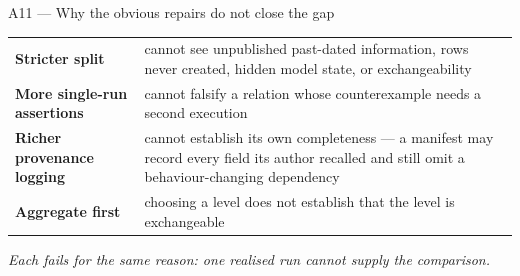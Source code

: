 \documentclass[aspectratio=169,11pt]{beamer}
\newcommand{\msg}[1]{%
  \vfill\vspace{0.2em}%
  \begin{center}\begin{minipage}{0.94\textwidth}\centering
  \small\itshape\color{black!70}#1
  \end{minipage}\end{center}}
\begin{document}
\begin{frame}{A11 --- Why the obvious repairs do not close the gap}
  \small
  \begin{tabular}{@{}p{}p{}@{}}
    \textcolor{oewarn}{\textbf{Stricter split}} &
      cannot see unpublished past-dated information, rows never created, hidden model state,
      or exchangeability\\[0.5em]
    \textcolor{oewarn}{\textbf{More single-run assertions}} &
      cannot falsify a relation whose counterexample needs a second execution\\[0.5em]
    \textcolor{oewarn}{\textbf{Richer provenance logging}} &
      cannot establish its own completeness --- a manifest may record every field its author
      recalled and still omit a behaviour-changing dependency\\[0.5em]
    \textcolor{oewarn}{\textbf{Aggregate first}} &
      choosing a level does not establish that the level is exchangeable\\
  \end{tabular}
  \msg{Each fails for the same reason: one realised run cannot supply the comparison.}
\end{frame}
\end{document}
